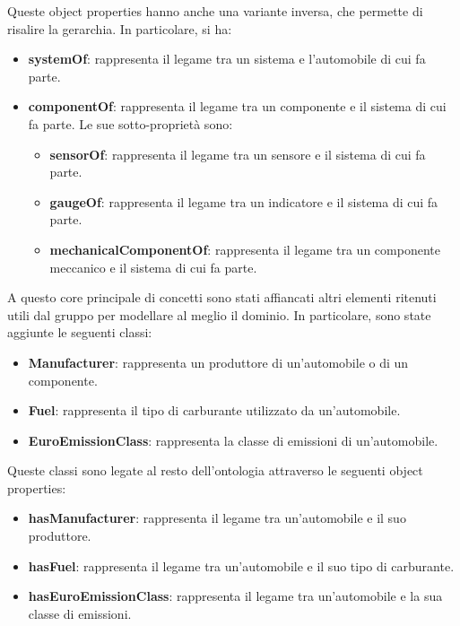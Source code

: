 Queste object properties hanno anche una variante inversa, che permette di risalire la gerarchia. In particolare, si ha:

\begin{itemize}
    \item \textbf{systemOf}: rappresenta il legame tra un sistema e l'automobile di cui fa parte.
    \item \textbf{componentOf}: rappresenta il legame tra un componente e il sistema di cui fa parte. Le sue sotto-proprietà sono:
          \begin{itemize}
              \item \textbf{sensorOf}: rappresenta il legame tra un sensore e il sistema di cui fa parte.
              \item \textbf{gaugeOf}: rappresenta il legame tra un indicatore e il sistema di cui fa parte.
              \item \textbf{mechanicalComponentOf}: rappresenta il legame tra un componente meccanico e il sistema di cui fa parte.
          \end{itemize}
\end{itemize}

A questo core principale di concetti sono stati affiancati altri elementi ritenuti utili dal gruppo per modellare al meglio il dominio. In particolare, sono state aggiunte le seguenti classi:

\begin{itemize}
    \item \textbf{Manufacturer}: rappresenta un produttore di un'automobile o di un componente.
    \item \textbf{Fuel}: rappresenta il tipo di carburante utilizzato da un'automobile.
    \item \textbf{EuroEmissionClass}: rappresenta la classe di emissioni di un'automobile.
\end{itemize}

Queste classi sono legate al resto dell'ontologia attraverso le seguenti object properties:

\begin{itemize}
    \item \textbf{hasManufacturer}: rappresenta il legame tra un'automobile e il suo produttore.
    \item \textbf{hasFuel}: rappresenta il legame tra un'automobile e il suo tipo di carburante.
    \item \textbf{hasEuroEmissionClass}: rappresenta il legame tra un'automobile e la sua classe di emissioni.
\end{itemize}

